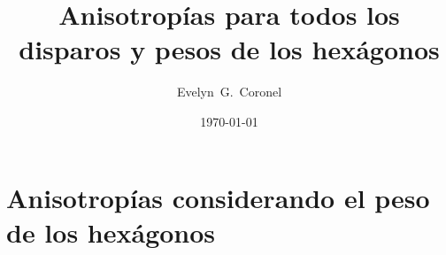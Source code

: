 



\title{Anisotropías para todos los disparos y pesos de los hexágonos}
\author{Evelyn~G.~Coronel}


\date[]{\lowercase{\today}} %


\maketitle

%
%



\section{Anisotropías  considerando el peso de los hexágonos}

